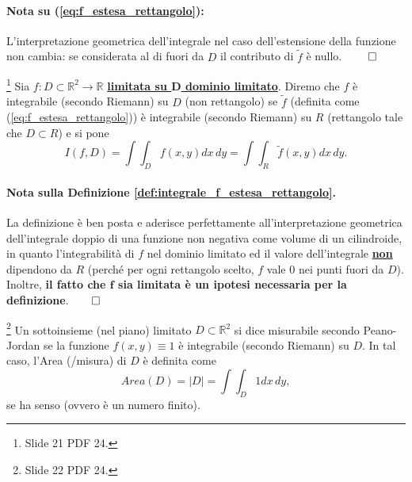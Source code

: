 \paragraph{Nota su (\ref{eq:f_estesa_rettangolo}):} L'interpretazione geometrica dell'integrale nel caso dell'estensione della funzione non cambia: se considerata al di fuori da $D$ il contributo di $\tilde{f}$ è nullo. $\qed$

\begin{definition}\label{def:integrale_f_estesa_rettangolo}
	\footnote{Slide 21 PDF 24.} Sia $f:D\subset \mathbb{R}^2\rightarrow\mathbb{R}$ \ul{\textbf{limitata su $\boldsymbol D$ dominio limitato}}. Diremo che $f$ è integrabile (secondo Riemann) su $D$ (non rettangolo) se $\tilde f$ (definita come (\ref{eq:f_estesa_rettangolo})) è integrabile (secondo Riemann) su $R$ (rettangolo tale che $D\subset R$) e si pone
	\begin{equation*}
		I(f, D) = \int\int_D f(x,y) dx\, dy = \int \int_R \tilde{f}(x,y) dx\, dy.
	\end{equation*}
\end{definition}

\paragraph{Nota sulla Definizione \ref{def:integrale_f_estesa_rettangolo}.} La definizione è ben posta e aderisce perfettamente all'interpretazione geometrica dell'integrale doppio di una funzione non negativa come volume di un cilindroide, in quanto l'integrabilità di $f$ nel dominio limitato ed il valore dell'integrale \textbf{\ul{non}} dipendono da $R$ (perché per ogni rettangolo scelto, $f$ vale 0 nei punti fuori da $D$). Inoltre, \textbf{il fatto che $\boldsymbol{f}$ sia limitata è un ipotesi necessaria per la definizione}.$\qed$

\begin{definition}\footnote{Slide 22 PDF 24.}
	Un sottoinsieme (nel piano) limitato $D\subset\mathbb{R}^2$ si dice misurabile secondo Peano-Jordan se la funzione $f(x,y)\equiv 1$ è integrabile (secondo Riemann) su $D$. In tal caso, l'Area (/misura) di $D$ è definita come
	\begin{equation}\label{eq:area_p-j_regione_piano}
		Area(D) = |D| =\int\int_D 1 dx\, dy,
	\end{equation}
	se ha senso (ovvero è un numero finito).
\end{definition}


